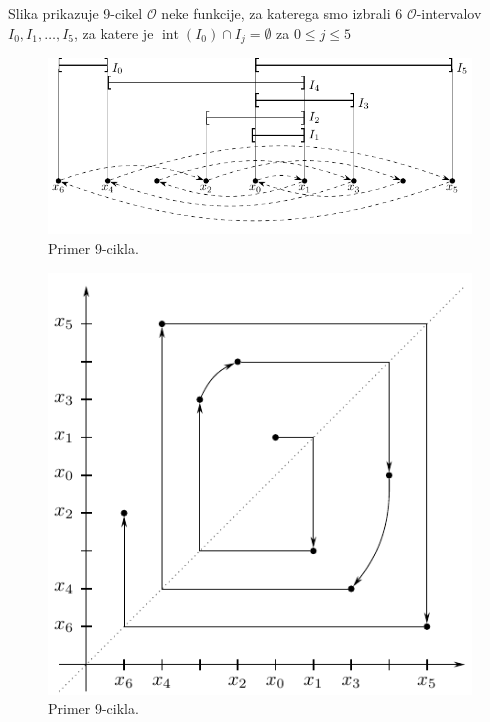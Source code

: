 \documentclass[mat2]{fmfdelo}
\DeclareMathOperator{\interior}{int}
\begin{document}
\begin{primer}[9-cikel] \label{primer3}
Slika prikazuje 9-cikel $\mathcal{O}$ neke funkcije, za katerega smo izbrali 6 $\mathcal{O}$-intervalov $I_0, I_1, \dots, I_5$, za katere je $\interior(I_0) \cap I_j = \emptyset$ za $0\leq j \leq 5$
\begin{figure}[h]
  \centering
  \includegraphics{images/devetcikel.pdf}
  \caption[Primer vektorske slike.]{Primer 9-cikla.}
  \label{fig:9cikel}
\end{figure}

\begin{figure}[h]
  \centering
  \includegraphics{images/spiral.pdf}
  \caption[Primer vektorske slike.]{Primer 9-cikla.}
  \label{fig:spiral}
\end{figure}


\end{primer}
\end{document}
